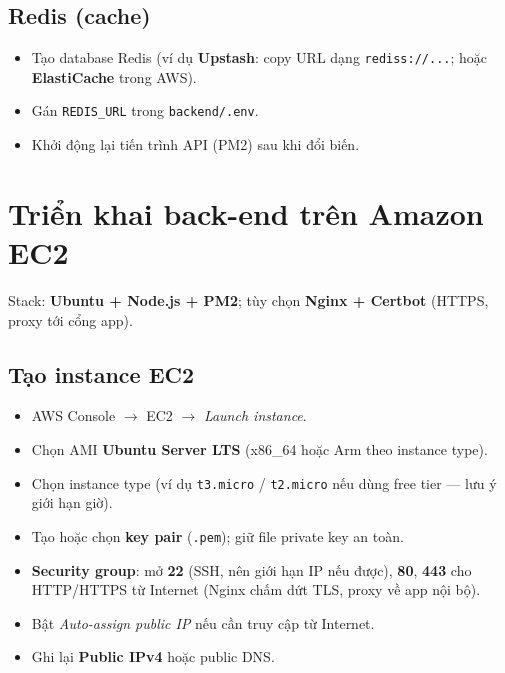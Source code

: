 \subsection{Redis (cache)}

\begin{itemize}
    \item Tạo database Redis (ví dụ \textbf{Upstash}: copy URL dạng \texttt{rediss://...}; hoặc \textbf{ElastiCache} trong AWS).
    \item Gán \texttt{REDIS\_URL} trong \texttt{backend/.env}.
    \item Khởi động lại tiến trình API (PM2) sau khi đổi biến.
\end{itemize}



\section{Triển khai back-end trên Amazon EC2}

Stack: \textbf{Ubuntu + Node.js + PM2}; tùy chọn \textbf{Nginx + Certbot} (HTTPS, proxy tới cổng app).

\subsection{Tạo instance EC2}

\begin{itemize}
    \item AWS Console $\rightarrow$ EC2 $\rightarrow$ \textit{Launch instance}.
    \item Chọn AMI \textbf{Ubuntu Server LTS} (x86\_64 hoặc Arm theo instance type).
    \item Chọn instance type (ví dụ \texttt{t3.micro} / \texttt{t2.micro} nếu dùng free tier --- lưu ý giới hạn giờ).
    \item Tạo hoặc chọn \textbf{key pair} (\texttt{.pem}); giữ file private key an toàn.
    \item \textbf{Security group}: mở \textbf{22} (SSH, nên giới hạn IP nếu được), \textbf{80}, \textbf{443} cho HTTP/HTTPS từ Internet (Nginx chấm dứt TLS, proxy về app nội bộ).
    \item Bật \textit{Auto-assign public IP} nếu cần truy cập từ Internet.
    \item Ghi lại \textbf{Public IPv4} hoặc public DNS.
\end{itemize}


